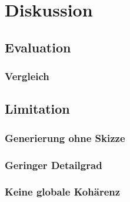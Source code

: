\chapter{Diskussion}



\section{Evaluation}

\subsection{Vergleich}

\section{Limitation}

\subsection{Generierung ohne Skizze}

\subsection{Geringer Detailgrad}

\subsection{Keine globale Kohärenz}

